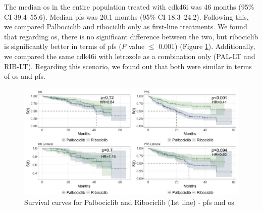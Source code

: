 The median \ac{os} in the entire population treated with \ac{cdk46i} was 46 months (95\% CI 39.4–55.6). Median \ac{pfs} was 20.1 months (95\% CI 18.3–24.2). Following this, we compared Palbociclib and ribociclib only as first-line treatments. We found that regarding \ac{os}, there is no significant difference between the two, but ribociclib is significantly better in terms of \ac{pfs} (\textit{P} value $\le$ 0.001) (Figure \ref{fig:interest}). Additionally, we compared the same \ac{cdk46i} with letrozole as a combination only (PAL-LT and RIB-LT). Regarding this scenario, we found out that both were similar in terms of \ac{os} and \ac{pfs}.


\begin{figure}[ht]
  \caption[Survival curves for Palbociclib and Ribociclib (1st line)]{Survival curves for Palbociclib and Ribociclib (1st line) - \ac{pfs} and \ac{os}}\label{fig:interest} 
  \includegraphics[scale=0.45]{figures/interest_curve_both.jpeg}%

\end{figure}


